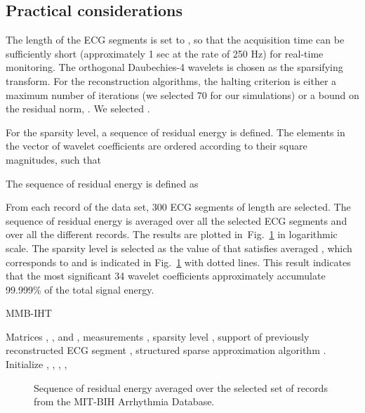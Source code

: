 \documentclass[journal]{IEEEtran}
\begin{document}
\subsection{Practical considerations}
The length of the ECG segments is set to , so that the acquisition time can be sufficiently short (approximately 1 sec at the rate of 250 Hz) for real-time monitoring. The orthogonal Daubechies-4 wavelets is chosen as the sparsifying transform. For the reconstruction algorithms, the halting criterion is either a maximum number of iterations (we selected 70 for our simulations) or a bound on the residual norm, . We selected .

For the sparsity level, a sequence of residual energy is defined. The elements in the vector of wavelet coefficients  are ordered according to their square magnitudes, such that

The sequence of residual energy is defined as

From each record of the data set, 300 ECG segments of length  are selected. The sequence of residual energy is averaged over all the selected ECG segments and over all the different records. The results are plotted in~Fig.~\ref{fig:5} in logarithmic scale. The sparsity level is selected as the value of  that satisfies averaged , which corresponds to  and is indicated in Fig.~\ref{fig:5} with dotted lines. This result indicates that the most significant 34 wavelet coefficients approximately accumulate 99.999\% of the total signal energy.
\label{ssec:CSPKSSSS}
\begin{algorithm}[t]
\caption{MMB-IHT}\label{alg:alg2}
\begin{algorithmic}[1]
\REQUIRE  Matrices , , and , measurements , sparsity level , support of previously reconstructed ECG segment , structured sparse approximation algorithm .
\STATE Initialize , , , , 
\STATE 
\STATE 
\STATE 
\STATE 
\ENDWHILE
\RETURN 
\end{algorithmic}
\end{algorithm}

\begin{figure}[t]
\caption{Sequence of residual energy averaged over the selected set of records from the MIT-BIH Arrhythmia Database.} \label{fig:5}
\end{figure}
\end{document}
